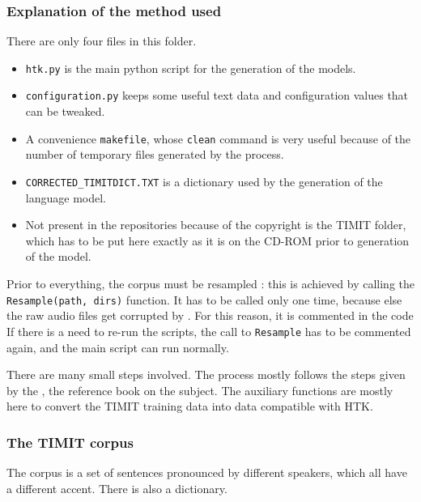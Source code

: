 \subsubsection{Explanation of the method used}
There are only four files in this folder.
\begin{itemize}
\item \texttt{htk.py} is the main python script for the generation of the models.
\item \texttt{configuration.py} keeps some useful text data and configuration values that can be tweaked.
\item A convenience \texttt{makefile}, whose \texttt{clean} command is very useful because of the number of temporary files generated by the process.
\item \texttt{CORRECTED\_TIMITDICT.TXT} is a dictionary used by the generation of the language model.
\item Not present in the repositories because of the copyright is the \ac{TIMIT} folder, which has to be put here exactly as it is on the CD-ROM prior to generation of the model.
\end{itemize}

Prior to everything, the corpus must be resampled : this is achieved by calling the \texttt{Resample(path, dirs)} function. It has to be called only one time, because else the raw audio files get corrupted by . For this reason, it is commented in the code
If there is a need to re-run the scripts, the call to \texttt{Resample} has to be commented again, and the main script can run normally.

There are many small steps involved. The process mostly follows the steps given by the \cite{htkbook}, the reference book on the subject.
The auxiliary functions are mostly here to convert the \ac{TIMIT} training data into data compatible with \ac{HTK}.

\subsubsection{The TIMIT corpus}
The corpus is a set of sentences pronounced by different speakers, which all have a different accent. There is also a dictionary.

